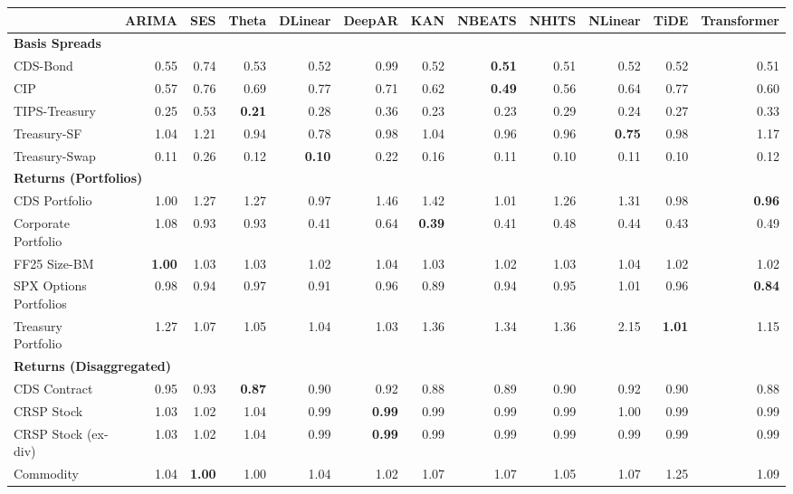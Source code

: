 \scriptsize
\setlength{\tabcolsep}{1.5pt}
\renewcommand{\arraystretch}{0.9}
\begin{tabular}{@{}lrrrrrrrrrrr@{}}
\toprule
 & ARIMA & SES & Theta & DLinear & DeepAR & KAN & NBEATS & NHITS & NLinear & TiDE & Transformer \\
\midrule
\multicolumn{12}{l}{\textbf{Basis Spreads}} \\
CDS-Bond & 0.55 & 0.74 & 0.53 & 0.52 & 0.99 & 0.52 & \textbf{0.51} & 0.51 & 0.52 & 0.52 & 0.51 \\
CIP & 0.57 & 0.76 & 0.69 & 0.77 & 0.71 & 0.62 & \textbf{0.49} & 0.56 & 0.64 & 0.77 & 0.60 \\
TIPS-Treasury & 0.25 & 0.53 & \textbf{0.21} & 0.28 & 0.36 & 0.23 & 0.23 & 0.29 & 0.24 & 0.27 & 0.33 \\
Treasury-SF & 1.04 & 1.21 & 0.94 & 0.78 & 0.98 & 1.04 & 0.96 & 0.96 & \textbf{0.75} & 0.98 & 1.17 \\
Treasury-Swap & 0.11 & 0.26 & 0.12 & \textbf{0.10} & 0.22 & 0.16 & 0.11 & 0.10 & 0.11 & 0.10 & 0.12 \\
\midrule
\multicolumn{12}{l}{\textbf{Returns (Portfolios)}} \\
CDS Portfolio & 1.00 & 1.27 & 1.27 & 0.97 & 1.46 & 1.42 & 1.01 & 1.26 & 1.31 & 0.98 & \textbf{0.96} \\
Corporate Portfolio & 1.08 & 0.93 & 0.93 & 0.41 & 0.64 & \textbf{0.39} & 0.41 & 0.48 & 0.44 & 0.43 & 0.49 \\
FF25 Size-BM & \textbf{1.00} & 1.03 & 1.03 & 1.02 & 1.04 & 1.03 & 1.02 & 1.03 & 1.04 & 1.02 & 1.02 \\
SPX Options Portfolios & 0.98 & 0.94 & 0.97 & 0.91 & 0.96 & 0.89 & 0.94 & 0.95 & 1.01 & 0.96 & \textbf{0.84} \\
Treasury Portfolio & 1.27 & 1.07 & 1.05 & 1.04 & 1.03 & 1.36 & 1.34 & 1.36 & 2.15 & \textbf{1.01} & 1.15 \\
\midrule
\multicolumn{12}{l}{\textbf{Returns (Disaggregated)}} \\
CDS Contract & 0.95 & 0.93 & \textbf{0.87} & 0.90 & 0.92 & 0.88 & 0.89 & 0.90 & 0.92 & 0.90 & 0.88 \\
CRSP Stock & 1.03 & 1.02 & 1.04 & 0.99 & \textbf{0.99} & 0.99 & 0.99 & 0.99 & 1.00 & 0.99 & 0.99 \\
CRSP Stock (ex-div) & 1.03 & 1.02 & 1.04 & 0.99 & \textbf{0.99} & 0.99 & 0.99 & 0.99 & 0.99 & 0.99 & 0.99 \\
Commodity & 1.04 & \textbf{1.00} & 1.00 & 1.04 & 1.02 & 1.07 & 1.07 & 1.05 & 1.07 & 1.25 & 1.09 \\

\end{tabular}
